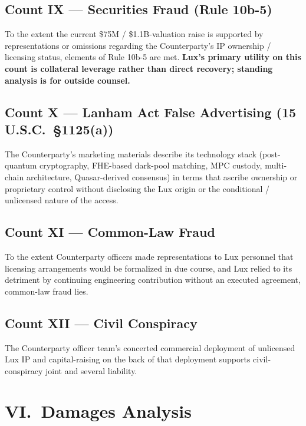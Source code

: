 \documentclass[11pt,letterpaper]{article}
\begin{document}
\subsection*{Count IX --- Securities Fraud (Rule 10b-5)}

To the extent the current \$75M / \$1.1B-valuation raise is supported by representations or
omissions regarding the Counterparty's IP ownership / licensing
status, elements of Rule 10b-5 are met. \textbf{Lux's primary
utility on this count is collateral leverage rather than direct
recovery; standing analysis is for outside counsel.}

\subsection*{Count X --- Lanham Act False Advertising (15 U.S.C.\ \S 1125(a))}

The Counterparty's marketing materials describe its technology stack
(post-quantum cryptography, FHE-based dark-pool matching, MPC
custody, multi-chain architecture, Quasar-derived consensus) in
terms that ascribe ownership or proprietary control without
disclosing the Lux origin or the conditional / unlicensed nature of
the access.

\subsection*{Count XI --- Common-Law Fraud}

To the extent Counterparty officers made representations to Lux
personnel that licensing arrangements would be formalized in due
course, and Lux relied to its detriment by continuing engineering
contribution without an executed agreement, common-law fraud lies.

\subsection*{Count XII --- Civil Conspiracy}

The Counterparty officer team's concerted commercial deployment of
unlicensed Lux IP and capital-raising on the back of that deployment
supports civil-conspiracy joint and several liability.

\section*{VI.\ Damages Analysis}
\end{document}
